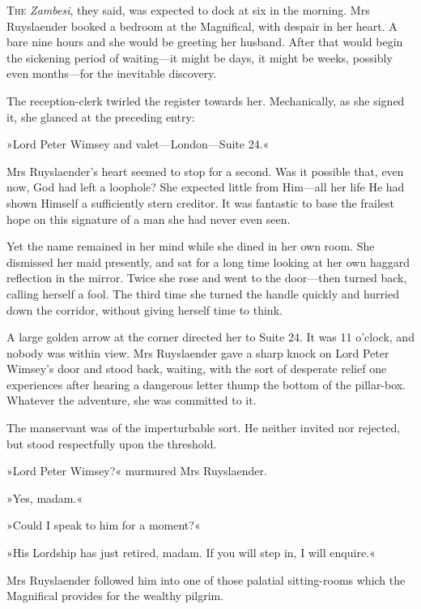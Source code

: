
\lettrine[lines=4]{T}{he} \textit{Zambesi}, they said, was expected to dock at six in the morning. Mrs Ruyslaender booked a bedroom at the Magnifical, with despair in her heart. A bare nine hours and she would be greeting her husband. After that would begin the sickening period of waiting—it might be days, it might be weeks, possibly even months—for the inevitable discovery.

The reception-clerk twirled the register towards her. Mechanically, as she signed it, she glanced at the preceding entry:

»Lord Peter Wimsey and valet—London—Suite 24.«

Mrs Ruyslaender's heart seemed to stop for a second. Was it possible that, even now, God had left a loophole? She expected little from Him—all her life He had shown Himself a sufficiently stern creditor. It was fantastic to base the frailest hope on this signature of a man she had never even seen.

Yet the name remained in her mind while she dined in her own room. She dismissed her maid presently, and sat for a long time looking at her own haggard reflection in the mirror. Twice she rose and went to the door—then turned back, calling herself a fool. The third time she turned the handle quickly and hurried down the corridor, without giving herself time to think.

A large golden arrow at the corner directed her to Suite 24. It was 11 o'clock, and nobody was within view. Mrs Ruyslaender gave a sharp knock on Lord Peter Wimsey's door and stood back, waiting, with the sort of desperate relief one experiences after hearing a dangerous letter thump the bottom of the pillar-box. Whatever the adventure, she was committed to it.

The manservant was of the imperturbable sort. He neither invited nor rejected, but stood respectfully upon the threshold.

»Lord Peter Wimsey?« murmured Mrs Ruyslaender.

»Yes, madam.«

»Could I speak to him for a moment?«

»His Lordship has just retired, madam. If you will step in, I will enquire.«

Mrs Ruyslaender followed him into one of those palatial sitting-rooms which the Magnifical provides for the wealthy pilgrim.

